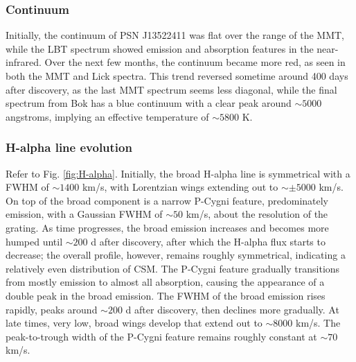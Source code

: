 \documentclass[iop]{emulateapj}
\begin{document}
\subsubsection{Continuum} \label{analysis:spec:cont}
Initially, the continuum of PSN J13522411 was flat over the range of the MMT, while the LBT spectrum showed emission and absorption features in the near-infrared. Over the next few months, the continuum became more red, as seen in both the MMT and Lick spectra. This trend reversed sometime around 400 days after discovery, as the last MMT spectrum seems less diagonal, while the final spectrum from Bok has a blue continuum with a clear peak around $\sim5000$ angstroms, implying an effective temperature of $\sim5800$ K.

\subsubsection{H-alpha line evolution}\label{analysis:spec:line}
Refer to Fig. \ref{fig:H-alpha}. Initially, the broad H-alpha line is symmetrical with a FWHM of $\sim1400$ km/s, with Lorentzian wings extending out to $\sim\pm5000$ km/s. On top of the broad component is a narrow P-Cygni feature, predominately emission, with a Gaussian FWHM of $\sim50$ km/s, about the resolution of the grating. As time progresses, the broad emission increases and becomes more humped until $\sim200$ d after discovery, after which the H-alpha flux starts to decrease; the overall profile, however, remains roughly symmetrical, indicating a relatively even distribution of CSM. The P-Cygni feature gradually transitions from mostly emission to almost all absorption, causing the appearance of a double peak in the broad emission. The FWHM of the broad emission rises rapidly, peaks around $\sim200$ d after discovery, then declines more gradually. At late times, very low, broad wings develop that extend out to $\sim 8000$ km/s. The peak-to-trough width of the P-Cygni feature remains roughly constant at $\sim70$ km/s.
\end{document}

